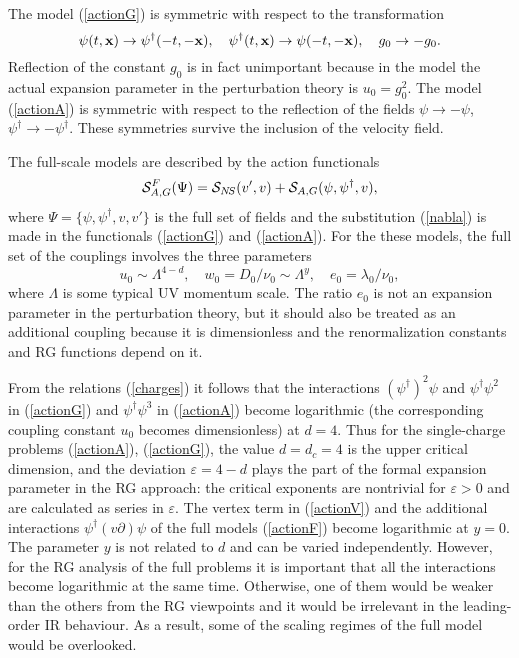 \documentclass[12pt]{iopart}
\begin{document}
The model (\ref{actionG}) is symmetric with respect to the transformation
\begin{equation}
\psi(t,{\bf x})\to \psi^{\dagger}(-t,-{\bf x}),
\quad \psi^{\dagger}(t,{\bf x})\to \psi(-t,-{\bf x}),
\quad g_{0}\to -g_{0}.
\label{symm}
\end{equation}
Reflection of the constant $g_{0}$ is in fact unimportant because in the
model the actual expansion parameter in the perturbation theory is
$u_{0}= g_{0}^{2}$. The model (\ref{actionA}) is symmetric with
respect to the reflection of the fields $\psi\to-\psi$,
$\psi^{\dagger}\to-\psi^{\dagger}$. These symmetries survive
the inclusion of the velocity field.

The full-scale models are described by the action functionals
\begin{equation}
{\cal S}_{A,G}^{F} (\Psi) = {\cal S}_{N\!S} (v',v) +
{\cal S}_{A,G} (\psi,\psi^{\dag},v),
\label{actionF}
\end{equation}
where  $\Psi = \{\psi,\psi^{\dag},v,v'\}$ is the full set of fields and
the substitution (\ref{nabla}) is made in the functionals (\ref{actionG})
and (\ref{actionA}). For the these models, the full set of the couplings
involves the three parameters
\begin{equation}
u_{0}  \sim \Lambda^{4-d}, \quad
w_{0} = D_{0}/\nu_{0} \sim \Lambda^{y}, \quad e_{0} = \lambda_{0}/\nu_{0},
\label{charges}
\end{equation}
where $\Lambda$ is some typical UV momentum scale. The ratio $e_{0}$ is not
an expansion parameter in the perturbation theory, but it should also be
treated as an additional coupling because it is dimensionless and the
renormalization constants and RG functions depend on it.

From the relations (\ref{charges}) it follows that the interactions
$(\psi^{\dagger})^2\psi$ and $\psi^{\dagger}\psi^2$ in (\ref{actionG})
and $\psi^{\dagger}\psi^{3}$ in (\ref{actionA}) become logarithmic (the
corresponding coupling constant $u_{0}$ becomes dimensionless) at $d=4$.
Thus for the single-charge problems (\ref{actionA}), (\ref{actionG}),
the value $d=d_{c}=4$ is the upper critical dimension, and the deviation
$\varepsilon=4-d$ plays the part of the formal expansion parameter
in the RG approach: the critical exponents are nontrivial
for $\varepsilon>0$ and are calculated as series in $\varepsilon$.
The vertex term in (\ref{actionV}) and the additional interactions
$\psi^{\dag}(v\partial)\psi$ of the full models (\ref{actionF}) become
logarithmic at $y=0$. The parameter $y$ is not related to $d$ and can
be varied independently. However, for the RG analysis of the full problems
it is important that
all the interactions become logarithmic at the same time. Otherwise, one
of them would be weaker than the others from the RG viewpoints and it would
be irrelevant in the leading-order IR behaviour. As a result, some of the
scaling regimes of the full model would be overlooked.
\end{document}
